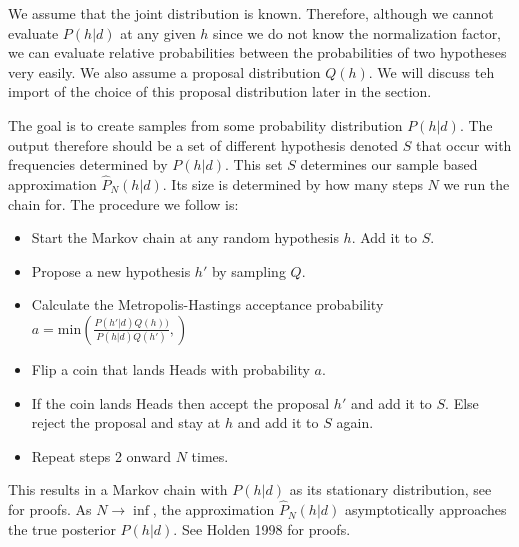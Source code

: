 We assume that the joint distribution is known. Therefore, although we cannot evaluate $P(h | d)$ at any given $h$ since we do not know the normalization factor, we can evaluate relative probabilities between the probabilities of two hypotheses very easily. We also assume a proposal distribution $Q(h)$. We will discuss teh import of the choice of this proposal distribution later in the section. 

The goal is to create samples from some probability distribution $P(h | d)$. The output therefore should be a set of different hypothesis denoted $S$ that occur with frequencies determined by $P(h | d)$. This set $S$ determines our sample based approximation $\hat{P}_N(h|d) $. Its size is determined by how many steps $N$ we run the chain for. The procedure we follow is:
\begin{itemize}
\item Start the Markov chain at any random hypothesis $h$. Add it to $S$.
\item Propose a new hypothesis $h'$ by sampling $Q$.
\item Calculate the Metropolis-Hastings acceptance probability $a = \text{min}\left( \frac{P(h' | d) Q(h))}{P(h | d) Q(h')}, \right)$
\item Flip a coin that lands Heads with probability $a$.
\item If the coin lands Heads then accept the proposal $h'$ and add it to $S$. Else reject the proposal and stay at $h$ and add it to $S$ again.
\item Repeat steps 2 onward $N$ times.
\end{itemize}

This results in a Markov chain with $P(h|d)$ as its stationary distribution, see \citet{blitzstein2014introduction} for proofs. As  $N \rightarrow \inf$, the approximation $\hat{P}_N(h|d) $ asymptotically approaches the true posterior $P(h | d)$. See Holden 1998 \cite{holden1998geometric} for proofs.

